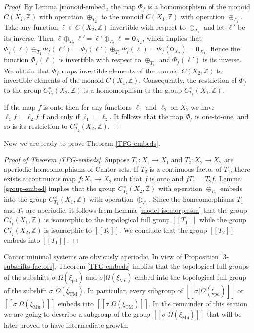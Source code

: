 \documentclass[12pt]{article}
\theoremstyle{definition}
\def\bZ{\mathbb{Z}}
\def\si{\sigma}
\def\Om{\Omega}
\def\xiTM{\xi_{\mathrm{TM}}}
\def\xipd{\xi_{\mathrm{pd}}}
\def\xiGE{\xi_{\mathrm{Mu}}}
\def\0{\mathbf{0}}
\begin{document}
\begin{proof}
By Lemma \ref{monoid-embed}, the map $\Phi_f$ is a homomorphism of the 
monoid $C(X_2,\bZ)$ with operation $\oplus_{T_2}$ to the monoid 
$C(X_1,\bZ)$ with operation $\oplus_{T_1}$.  Take any function $\ell\in 
C(X_2,\bZ)$ invertible with respect to $\oplus_{T_2}$ and let $\ell'$ be 
its inverse.  Then $\ell\oplus_{T_2}\ell'=\ell'\oplus_{T_2}\ell 
=\0_{X_2}$, which implies that $\Phi_f(\ell)\oplus_{T_1}\Phi_f(\ell')= 
\Phi_f(\ell')\oplus_{T_1}\Phi_f(\ell)=\Phi_f(\0_{X_2})=\0_{X_1}$.  Hence 
the function $\Phi_f(\ell)$ is invertible with respect to $\oplus_{T_1}$ 
and $\Phi_f(\ell')$ is its inverse.  We obtain that $\Phi_f$ maps 
invertible elements of the monoid $C(X_2,\bZ)$ to invertible elements of 
the monoid $C(X_1,\bZ)$.  Consequently, the restriction of $\Phi_f$ to the 
group $C^\times_{T_2}(X_2,\bZ)$ is a homomorphism to the group 
$C^\times_{T_1}(X_1,\bZ)$.

If the map $f$ is onto then for any functions $\ell_1$ and $\ell_2$ on 
$X_2$ we have $\ell_1f=\ell_2f$ if and only if $\ell_1=\ell_2$.  It follows 
that the map $\Phi_f$ is one-to-one, and so is its restriction to 
$C^\times_{T_2}(X_2,\bZ)$.
\end{proof}

Now we are ready to prove Theorem \ref{TFG-embeds}.

\begin{proof}[Proof of Theorem \ref{TFG-embeds}]
Suppose $T_1:X_1\to X_1$ and $T_2:X_2\to X_2$ are aperiodic homeomorphisms 
of Cantor sets.  If $T_2$ is a continuous factor of $T_1$, there exists a 
continuous map $f:X_1\to X_2$ such that $f$ is onto and $fT_1=T_2f$.  Lemma 
\ref{group-embed} implies that the group $C^\times_{T_2}(X_2,\bZ)$ with 
operation $\oplus_{T_2}$ embeds into the group $C^\times_{T_1}(X_1,\bZ)$ 
with operation $\oplus_{T_1}$.  Since the homeomorphisms $T_1$ and $T_2$ 
are aperiodic, it follows from Lemma \ref{model-isomorphism} that the group 
$C^\times_{T_1}(X_1,\bZ)$ is isomorphic to the topological full group 
$[[T_1]]$ while the group $C^\times_{T_2}(X_2,\bZ)$ is isomorphic to 
$[[T_2]]$.  We conclude that the group $[[T_2]]$ embeds into $[[T_1]]$.
\end{proof}

Cantor minimal systems are obviously aperiodic.  In view of Proposition 
\ref{3-subshifts-factors}, Theorem \ref{TFG-embeds} implies that the 
topological full groups of the subshifts $\si|\Om(\xipd)$ and 
$\si|\Om(\xiGE)$ embed into the topological full group of the subshift 
$\si|\Om(\xiTM)$.  In particular, every subgroup of $[[\si|\Omega(\xipd)]]$ 
or $[[\si|\Omega(\xiGE)]]$ embeds into $[[\si|\Omega(\xiTM)]]$.  In the 
remainder of this section we are going to describe a subgroup of the group 
$[[\si|\Omega(\xiGE)]]$ that will be later proved to have intermediate 
growth.
\end{document}
